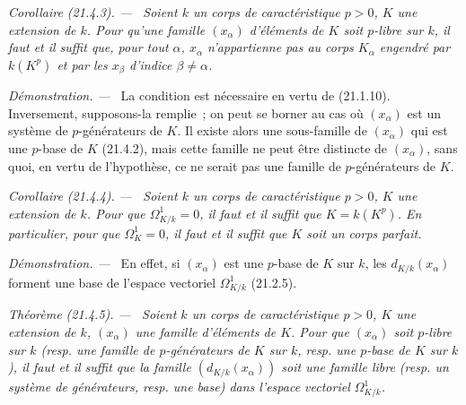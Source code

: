 \documentclass[10pt,oneside]{book}
\makeatletter
\newcommand{\setmanualcurrentlabel}[1]{\def\@currentlabel{#1}}
\newcommand{\oldpage}[2][]{%
  \setcounter{footnote}{0}%
  \marginpar{\scriptsize\textbf{#1}~|~#2}\ignorespaces}
\newenvironment{theorem}[1][]{%
  \setmanualcurrentlabel{#1}\par\medskip\noindent\itshape Théorème (#1). ---\ }{\par}
\newenvironment{corollary}[1][]{%
  \setmanualcurrentlabel{#1}\par\medskip\noindent\itshape Corollaire (#1). ---\ }{\par}
\newenvironment{proof}{%
  \par\medskip\noindent\textit{Démonstration. ---\ }}{\par}
\makeatother
\begin{document}
\begin{corollary}[21.4.3]
\label{0.21.4.3-fr}
Soient $k$ un corps de caractéristique $p>0$, $K$ une extension de $k$.
Pour qu'une famille $(x_\alpha)$ d'éléments de $K$ soit $p$-libre sur $k$,
il faut et il suffit que, pour tout $\alpha$, $x_\alpha$ n'appartienne pas au
corps $K_\alpha$ engendré par $k(K^p)$ et par les $x_\beta$ d'indice
$\beta\neq\alpha$.
\end{corollary}

\begin{proof}
La condition est nécessaire en vertu de (21.1.10). Inversement, supposons-la
remplie~; on peut se borner au cas où $(x_\alpha)$ est un système de
$p$-générateurs de $K$. Il existe alors une sous-famille de $(x_\alpha)$ qui
est une $p$-base de $K$ (21.4.2), mais cette famille ne peut être distincte de
$(x_\alpha)$, sans quoi, en vertu de l'hypothèse, ce ne serait pas une famille
de $p$-générateurs de $K$.
\end{proof}

\oldpage[0\textsubscript{IV-1}]{163}
\begin{corollary}[21.4.4]
\label{0.21.4.4-fr}
Soient $k$ un corps de caractéristique $p>0$, $K$ une extension de $k$.
Pour que $\Omega^1_{K/k}=0$, il faut et il suffit que $K=k(K^p)$.
En particulier, pour que $\Omega^1_K=0$, il faut et il suffit que $K$ soit
un corps parfait.
\end{corollary}

\begin{proof}
En effet, si $(x_\alpha)$ est une $p$-base de $K$ sur $k$, les
$d_{K/k}(x_\alpha)$ forment une base de l'espace vectoriel $\Omega^1_{K/k}$
(21.2.5).
\end{proof}

\begin{theorem}[21.4.5]
\label{0.21.4.5-fr}
Soient $k$ un corps de caractéristique $p>0$, $K$ une extension de $k$,
$(x_\alpha)$ une famille d'éléments de $K$. Pour que $(x_\alpha)$ soit
$p$-libre sur $k$ (resp. une famille de $p$-générateurs de $K$ sur $k$,
resp. une $p$-base de $K$ sur $k$), il faut et il suffit que la famille
$(d_{K/k}(x_\alpha))$ soit une famille libre (resp. un système de
générateurs, resp. une base) dans l'espace vectoriel $\Omega^1_{K/k}$.
\end{theorem}
\end{document}
